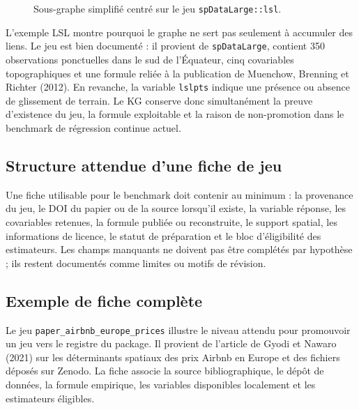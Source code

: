\documentclass[11pt,a4paper]{article}
\begin{document}
\begin{figure}[H]
{}
\caption{Sous-graphe simplifié centré sur le jeu \texttt{spDataLarge::lsl}.}
\label{fig:kg-lsl}
\end{figure}

L'exemple LSL montre pourquoi le graphe ne sert pas seulement à accumuler des liens. Le jeu est bien documenté : il provient de \texttt{spDataLarge}, contient 350 observations ponctuelles dans le sud de l'Équateur, cinq covariables topographiques et une formule reliée à la publication de Muenchow, Brenning et Richter (2012). En revanche, la variable \texttt{lslpts} indique une présence ou absence de glissement de terrain. Le KG conserve donc simultanément la preuve d'existence du jeu, la formule exploitable et la raison de non-promotion dans le benchmark de régression continue actuel.

\subsection{Structure attendue d'une fiche de jeu}

Une fiche utilisable pour le benchmark doit contenir au minimum : la provenance du jeu, le DOI du papier ou de la source lorsqu'il existe, la variable réponse, les covariables retenues, la formule publiée ou reconstruite, le support spatial, les informations de licence, le statut de préparation et le bloc d'éligibilité des estimateurs. Les champs manquants ne doivent pas être complétés par hypothèse ; ils restent documentés comme limites ou motifs de révision.

\subsection{Exemple de fiche complète}

Le jeu \texttt{paper\_airbnb\_europe\_prices} illustre le niveau attendu pour promouvoir un jeu vers le registre du package. Il provient de l'article de Gyodi et Nawaro (2021) sur les déterminants spatiaux des prix Airbnb en Europe et des fichiers déposés sur Zenodo. La fiche associe la source bibliographique, le dépôt de données, la formule empirique, les variables disponibles localement et les estimateurs éligibles.
\end{document}
